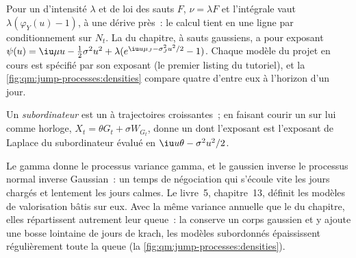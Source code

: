 \admitted

Pour un  d'intensité $\lambda$ et de loi des sauts $F$, $\nu = \lambda F$ et l'intégrale vaut
$\lambda(\varphi_Y(u) - 1)$, à une dérive près~: le calcul tient en une ligne par conditionnement sur $N_t$.
La  du chapitre, à sauts gaussiens, a pour exposant $\psi(u) = \iu\mu u - \tfrac12\sigma^2u^2 + \lambda(e^{\iu u\mu_J - \sigma_J^2u^2/2} -
1)$. Chaque modèle du projet en cours est spécifié par son exposant (le premier
listing du tutoriel), et la \cref{fig:qm:jump-processes:densities} compare quatre d'entre eux à l'horizon d'un jour.

\begin{definition}[Subordinateur]\label{def:qm:jump-processes:subordinator}
Un \emph{subordinateur} est un  à trajectoires croissantes~; en faisant courir
un  sur lui comme horloge, $X_t = \theta G_t + \sigma W_{G_t}$, donne un  dont l'exposant est
l'exposant de Laplace du subordinateur évalué en $\iu u\theta - \sigma^2u^2/2$.
\end{definition}

Le  gamma donne le processus variance gamma, et le  gaussien inverse le processus normal
inverse Gaussian~: un temps de négociation qui s'écoule vite les jours chargés et lentement les jours calmes. Le
livre~5, chapitre~13, définit les modèles de valorisation bâtis sur eux. Avec la même variance annuelle que le
 du chapitre, elles répartissent autrement leur queue~: la  conserve un corps gaussien
et y ajoute une bosse lointaine de jours de krach, les modèles subordonnés épaississent régulièrement toute la queue
(la \cref{fig:qm:jump-processes:densities}).

